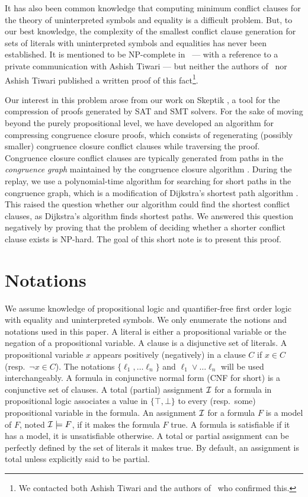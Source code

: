 \documentclass{easychair}
\begin{document}
It has also been common knowledge that computing minimum conflict clauses for
the theory of uninterpreted symbols and equality is a difficult problem.  But,
to our best knowledge, the complexity of the smallest conflict clause generation
for sets of literals with uninterpreted symbols and equalities has never been
established.  It is mentioned to be NP-complete in~\cite{Nieuwenhuis8} --- with
a reference to a private communication with Ashish Tiwari --- but neither the
authors of~\cite{Nieuwenhuis8} nor Ashish Tiwari published a written proof of
this fact\footnote{We contacted both Ashish Tiwari and the authors
  of~\cite{Nieuwenhuis8} who confirmed this.}.

Our interest in this problem arose from our work on Skeptik \cite{Boudou1}, a tool for the compression of proofs generated by SAT and SMT solvers. For the sake of moving beyond the purely propositional level, we have developed an algorithm for compressing congruence closure proofs, which consists of regenerating (possibly smaller) congruence closure conflict clauses while traversing the proof. Congruence closure conflict clauses are typically generated from paths in the \emph{congruence graph} maintained by the congruence closure algorithm \cite{Fontaine2004,Nieuwenhuis6,Nieuwenhuis9}. During the replay, we use a polynomial-time algorithm for searching for short paths in the congruence graph, which is a modification of Dijkstra's shortest path algorithm \cite{Dijkstra1959}. This raised the question whether our algorithm could find the shortest conflict clauses, as Dijkstra's algorithm finds shortest paths. We answered this question negatively by proving that the problem of deciding whether a shorter conflict clause exists is NP-hard. The goal of this short note is to present this proof.

\section*{Notations}

We assume knowledge of propositional logic and quantifier-free first order logic
with equality and uninterpreted symbols.  We only enumerate the notions and
notations used in this paper.
A literal is either a propositional variable or the negation of a propositional
variable.  A clause is a disjunctive set of literals.  A propositional variable
$x$ appears positively (negatively) in a clause $C$ if $x \in C$ (resp.\ $\neg x
\in C$).  The notations $\{\ell_1, \dots \ell_n\}$ and $\ell_1 \vee \dots
\ell_n$ will be used interchangeably.  A formula in conjunctive normal form (CNF
for short) is a conjunctive set of clauses.  A total (partial) assignment $\cal
I$ for a formula in propositional logic associates a value in $\{\top, \bot\}$
to every (resp.\ some) propositional variable in the formula.  An assignment
$\cal I$ for a formula $F$ is a model of $F$, noted ${\cal I}\models F$, if it makes
the formula $F$ true.  A formula is satisfiable if it has a model, it is
unsatisfiable otherwise.  A total or partial assignment can be perfectly
defined by the set of literals it makes true.  By default, an assignment is
total unless explicitly said to be partial.
\end{document}
